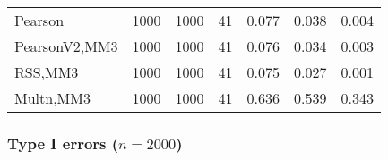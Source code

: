 \documentclass[
]{article}
\begin{document}
\begin{table}[H]
{\begin{tabular}[t]{lrrrrrr}
\hspace{1em}Pearson & 1000 & 1000 & 41 & 0.077 & 0.038 & 0.004\\
\hspace{1em}PearsonV2,MM3 & 1000 & 1000 & 41 & 0.076 & 0.034 & 0.003\\
\hspace{1em}RSS,MM3 & 1000 & 1000 & 41 & 0.075 & 0.027 & 0.001\\
\hspace{1em}Multn,MM3 & 1000 & 1000 & 41 & 0.636 & 0.539 & 0.343\\
\bottomrule
\end{tabular}}
\end{table}

\hypertarget{type-i-errors-n2000-1}{%
\subsubsection{\texorpdfstring{Type I errors
(\(n=2000\))}{Type I errors (n=2000)}}\label{type-i-errors-n2000-1}}
\end{document}
